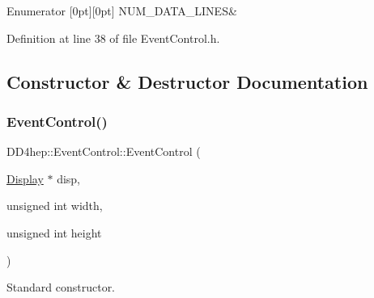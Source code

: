 \begin{DoxyEnumFields}{Enumerator}
[0pt][0pt]{}\hypertarget{class_d_d4hep_1_1_event_control_a9a7c581934b4dff35b3753b630b15f74a0e8834462de33571d882f9225d1ca704}{}\label{class_d_d4hep_1_1_event_control_a9a7c581934b4dff35b3753b630b15f74a0e8834462de33571d882f9225d1ca704} 
N\+U\+M\+\_\+\+D\+A\+T\+A\+\_\+\+L\+I\+N\+ES&\\
\hline

\end{DoxyEnumFields}


Definition at line 38 of file Event\+Control.\+h.



\subsection{Constructor \& Destructor Documentation}
\hypertarget{class_d_d4hep_1_1_event_control_a5abad625ba8ddb768f2dff26ec06c987}{}\label{class_d_d4hep_1_1_event_control_a5abad625ba8ddb768f2dff26ec06c987} 
\subsubsection{\texorpdfstring{Event\+Control()}{EventControl()}}
{\footnotesize\ttfamily D\+D4hep\+::\+Event\+Control\+::\+Event\+Control (\begin{DoxyParamCaption}\item[{\hyperlink{class_d_d4hep_1_1_display}{Display} $\ast$}]{disp,  }\item[{unsigned int}]{width,  }\item[{unsigned int}]{height }\end{DoxyParamCaption})}



Standard constructor. 

\hypertarget{class_d_d4hep_1_1_event_control_ad8fcc15169bd6829ac92497adf216b94}{}\label{class_d_d4hep_1_1_event_control_ad8fcc15169bd6829ac92497adf216b94} 
